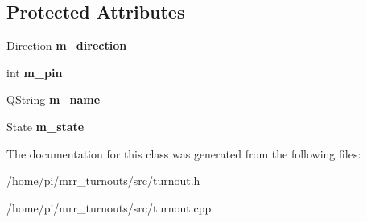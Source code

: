 \subsection*{Protected Attributes}
\begin{DoxyCompactItemize}
\item 
\mbox{\label{classTurnout_a0e975ccac37e52ad1cad7adea5ef130b}} 
Direction {\bfseries m\+\_\+direction}
\item 
\mbox{\label{classTurnout_a86db8a9921b41043a984efbeada6d861}} 
int {\bfseries m\+\_\+pin}
\item 
\mbox{\label{classTurnout_aeb7d7a0b3f175d60f07babe7b6173988}} 
Q\+String {\bfseries m\+\_\+name}
\item 
\mbox{\label{classTurnout_ab4e32db640be95dbd4c0d7ca70a43b45}} 
State {\bfseries m\+\_\+state}
\end{DoxyCompactItemize}


The documentation for this class was generated from the following files\+:\begin{DoxyCompactItemize}
\item 
/home/pi/mrr\+\_\+turnouts/src/turnout.\+h\item 
/home/pi/mrr\+\_\+turnouts/src/turnout.\+cpp\end{DoxyCompactItemize}
